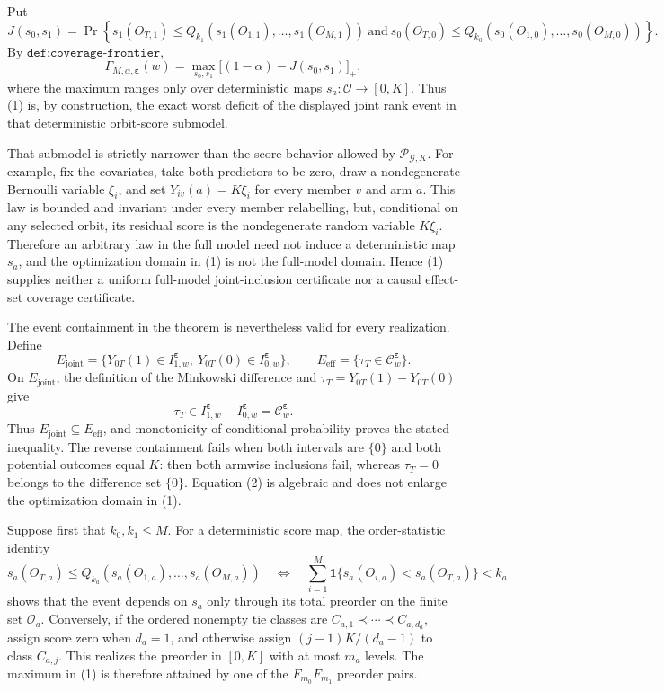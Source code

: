Put
\[
J(s_0,s_1)=\Pr\!\left\{s_1(O_{T,1})\le Q_{k_1}(s_1(O_{1,1}),\ldots,s_1(O_{M,1}))\ \text{and}\ s_0(O_{T,0})\le Q_{k_0}(s_0(O_{1,0}),\ldots,s_0(O_{M,0}))\right\}.
\]
By \(\texttt{def:coverage-frontier}\),
\[
\Gamma_{M,\alpha,\boldsymbol\varepsilon}(w)
=\max_{s_0,s_1}\bigl[(1-\alpha)-J(s_0,s_1)\bigr]_+,
\tag{1}
\]
where the maximum ranges only over deterministic maps \(s_a:\mathcal O\to[0,K]\). Thus (1) is, by construction, the exact worst deficit of the displayed joint rank event in that deterministic orbit-score submodel.

That submodel is strictly narrower than the score behavior allowed by \(\mathcal P_{\mathcal G,K}\). For example, fix the covariates, take both predictors to be zero, draw a nondegenerate Bernoulli variable \(\xi_i\), and set \(Y_{iv}(a)=K\xi_i\) for every member \(v\) and arm \(a\). This law is bounded and invariant under every member relabelling, but, conditional on any selected orbit, its residual score is the nondegenerate random variable \(K\xi_i\). Therefore an arbitrary law in the full model need not induce a deterministic map \(s_a\), and the optimization domain in (1) is not the full-model domain. Hence (1) supplies neither a uniform full-model joint-inclusion certificate nor a causal effect-set coverage certificate.

The event containment in the theorem is nevertheless valid for every realization. Define
\[
E_{\mathrm{joint}}=\{Y_{0T}(1)\in I^{\boldsymbol\varepsilon}_{1,w},\ Y_{0T}(0)\in I^{\boldsymbol\varepsilon}_{0,w}\},
\qquad
E_{\mathrm{eff}}=\{\tau_T\in\mathcal C^{\boldsymbol\varepsilon}_w\}.
\]
On \(E_{\mathrm{joint}}\), the definition of the Minkowski difference and \(\tau_T=Y_{0T}(1)-Y_{0T}(0)\) give
\[
\tau_T\in I^{\boldsymbol\varepsilon}_{1,w}-I^{\boldsymbol\varepsilon}_{0,w}
=\mathcal C^{\boldsymbol\varepsilon}_w.
\tag{2}
\]
Thus \(E_{\mathrm{joint}}\subseteq E_{\mathrm{eff}}\), and monotonicity of conditional probability proves the stated inequality. The reverse containment fails when both intervals are \(\{0\}\) and both potential outcomes equal \(K\): then both armwise inclusions fail, whereas \(\tau_T=0\) belongs to the difference set \(\{0\}\). Equation (2) is algebraic and does not enlarge the optimization domain in (1).

Suppose first that \(k_0,k_1\le M\). For a deterministic score map, the order-statistic identity
\[
s_a(O_{T,a})\le Q_{k_a}(s_a(O_{1,a}),\ldots,s_a(O_{M,a}))
\quad\Longleftrightarrow\quad
\sum_{i=1}^M\mathbf 1\{s_a(O_{i,a})<s_a(O_{T,a})\}<k_a
\tag{3}
\]
shows that the event depends on \(s_a\) only through its total preorder on the finite set \(\mathcal O_a\). Conversely, if the ordered nonempty tie classes are \(C_{a,1}\prec\cdots\prec C_{a,d_a}\), assign score zero when \(d_a=1\), and otherwise assign \((j-1)K/(d_a-1)\) to class \(C_{a,j}\). This realizes the preorder in \([0,K]\) with at most \(m_a\) levels. The maximum in (1) is therefore attained by one of the \(F_{m_0}F_{m_1}\) preorder pairs.

